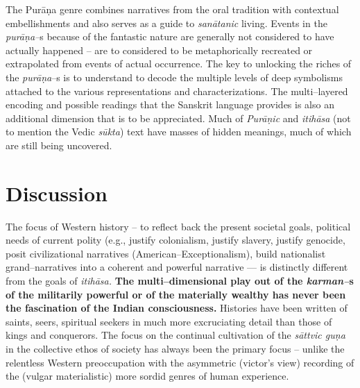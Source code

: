 The Purāṇa genre combines narratives from the oral tradition with contextual embellishments and also serves as a guide to \textit{sanātanic} living. Events in the \textit{purāṇa–}s because of the fantastic nature are generally not considered to have actually happened – are to considered to be metaphorically recreated or extrapolated from events of actual occurrence. The key to unlocking the riches of the \textit{purāṇa}–s is to understand to decode the multiple levels of deep symbolisms attached to the various representations and characterizations. The multi–layered encoding and possible readings that the Sanskrit language provides is also an additional dimension that is to be appreciated. Much of \textit{Purāṇic} and \textit{itihāsa} (not to mention the Vedic \textit{sūkta}) text have masses of hidden meanings, much of which are still being uncovered.


\section*{Discussion}

The focus of Western history – to reflect back the present societal goals, political needs of current polity (e.g., justify colonialism, justify slavery, justify genocide, posit civilizational narratives (American–Exceptionalism), build nationalist grand–narratives into a coherent and powerful narrative — is distinctly different from the goals of \textit{itihāsa.} \textbf{The multi–dimensional play out of the \textit{karman–}s of the militarily powerful or of the materially wealthy has never been the fascination of the Indian consciousness.} Histories have been written of saints, seers, spiritual seekers in much more excruciating detail than those of kings and conquerors. The focus on the continual cultivation of the \textit{sāttvic guṇa} in the collective ethos of society has always been the primary focus – unlike the relentless Western preoccupation with the asymmetric (victor’s view) recording of the (vulgar materialistic) more sordid genres of human experience.

